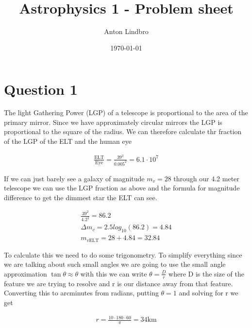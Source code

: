 \documentclass[a4paper]{article}
\title{Astrophysics 1 - Problem sheet}
\author{Anton Lindbro}
\date{\today}
\begin{document}
\maketitle


\section*{Question 1}


The light Gathering Power (LGP) of a telescope is proportional to the area of the primary mirror. Since we have approximately circular mirrors the LGP is proportional to the square of the radius. We can therefore calculate thr fraction of the LGP of the ELT and the human eye

\begin{align}
    \frac{\text{ELT}}{\text{Eye}} = \frac{39^2}{0.005^2} = 6.1 \cdot 10^7
\end{align}


If we can just barely see a galaxy of magnitude $m_v = 28$ through our 4.2 meter telescope we can use the LGP fraction as above and the formula for magnitude difference to get the dimmest star the ELT can see. 

\begin{align}
    \frac{39^2}{4.2^2} = 86.2\\
    \Delta m_v = 2.5 log_{10}(86.2) = 4.84\\
    m_{v\text{ELT}} = 28 + 4.84 = 32.84
\end{align}


To calculate this we need to do some trigonometry. To simplify everything since we are talking about such small angles we are going to use the small angle approximation $\tan \theta \approx \theta$ with this we can write $\theta = \frac{D}{r}$ where D is the size of the feature we are trying to resolve and r is our distance away from that feature. Converting this to arcminutes from radians, putting $\theta = 1$ and solving for r we get 

\begin{align}
    r = \frac{10 \cdot 180 \cdot 60}{\pi} = 34 \text{km}
\end{align}
\end{document}
